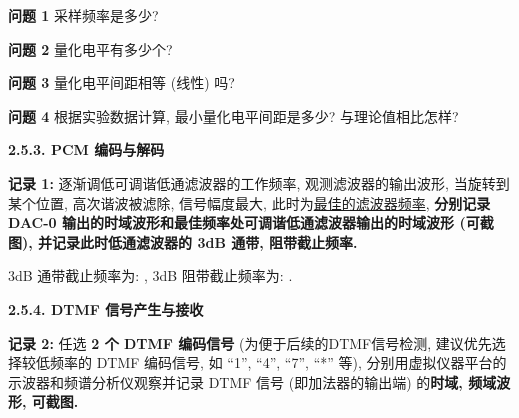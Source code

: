 \documentclass{dspreport}
\begin{document}
\begin{figure}[H]
    \centering
\end{figure}

\begin{block}

\end{block}

\textbf{问题 1} 采样频率是多少?
\begin{block}

\end{block}

\textbf{问题 2} 量化电平有多少个?
\begin{block}

\end{block}

\textbf{问题 3} 量化电平间距相等 (线性) 吗?
\begin{block}

\end{block}

\textbf{问题 4} 根据实验数据计算, 最小量化电平间距是多少? 与理论值相比怎样?
\begin{block}

\end{block}

\textbf{2.5.3. PCM 编码与解码}

\textbf{记录 1:} 逐渐调低可调谐低通滤波器的工作频率, 观测滤波器的输出波形, 当旋转到某个位置, 高次谐波被滤除, 信号幅度最大, 此时为\underline{最佳的滤波器频率}, \textbf{分别记录 DAC-0 输出的时域波形和最佳频率处可调谐低通滤波器输出的时域波形 (可截图), 并记录此时低通滤波器的 3dB 通带, 阻带截止频率.}
\begin{block}

\end{block}

\begin{figure}[H]
    \centering
\end{figure}

\begin{block}

\end{block}

3dB 通带截止频率为: \underline{\blank{  }}, 3dB 阻带截止频率为: \underline{\blank{  }}.

\textbf{2.5.4. DTMF 信号产生与接收}

\textbf{记录 2:} 任选 \textbf{2 个 DTMF 编码信号} (为便于后续的DTMF信号检测, 建议优先选择较低频率的 DTMF 编码信号, 如 ``1'', ``4'', ``7'', ``*'' 等), 分别用虚拟仪器平台的示波器和频谱分析仪观察并记录 DTMF 信号 (即加法器的输出端) 的\textbf{时域, 频域波形, 可截图.}
\end{document}
